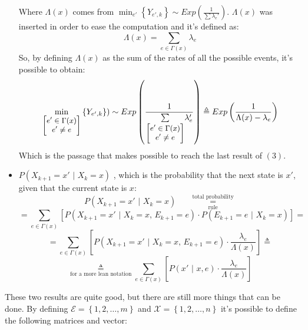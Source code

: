 \documentclass[12pt,a4paper]{article}
\begin{document}
\begin{itemize}
\noindent
Where $\Lambda(x)$ comes from $\min_{e'}{\left\lbrace Y_{e',k}\right\rbrace } \sim Exp\left(\frac{1}
{\sum{\lambda_e'}}\right)$. $\Lambda(x)$ was inserted in order to ease the computation and it's defined as:
$$
\Lambda(x)=\sum_{e \in \Gamma (x)}{\lambda_e}
$$
So, by defining $\Lambda(x)$ as the sum of the rates of all the possible events, it's possible to obtain:
$$
\min_{\small\left[
\begin{matrix}
e'\in \Gamma(x) \cr
e'\neq e
\end{matrix}\right]
}{\left\lbrace Y_{e',k}\right\rbrace }) \sim Exp\left(\frac{1}{\underset{{\small\left[
\begin{matrix}
e'\in \Gamma(x) \cr
e'\neq e
\end{matrix}\right]
}}{\sum
}\lambda_e'}\right)
\triangleq
Exp \left(\frac{1}{\Lambda(x)-\lambda_e}\right)
$$
Which is the passage that makes possible to reach the last result of $(3)$.
\newpage
\item $P(X_{k+1}=x'\hspace{4pt}|\hspace{4pt}X_k=x)$ , which is the probability that the next state is $x'$, given that the current state is $x$:
$$
P(X_{k+1}=x'\hspace{4pt}|\hspace{4pt}X_k=x) \hspace{20pt}\underset{\textrm{rule}}{\overset{\textrm{total probability}}{=}}
$$
$$
=\sum_{e\in \Gamma(x)}{
\left[
P\left(
X_{k+1}=x'\hspace{4pt}|\hspace{4pt}X_k=x\textrm{, }E_{k+1}=e
\right)\cdot
P\left(
E_{k+1}=e\hspace{4pt}|\hspace{4pt}X_k=x
\right)
\right]
}=
$$
$$
=
\sum_{e\in \Gamma(x)}{
\left[
P\left(
X_{k+1}=x'\hspace{4pt}|\hspace{4pt}X_k=x\textrm{, }E_{k+1}=e
\right)\cdot
\frac{\lambda_e}{\Lambda(x)}
\right]}\triangleq
$$
$$
\underset{\textrm{for a more lean notation}}{\triangleq}
\sum_{e\in \Gamma(x)}{
\left[
P\left(x'\hspace{4pt}|\hspace{4pt}x,e
\right)\cdot
\frac{\lambda_e}{\Lambda(x)}
\right]}
$$
\end{itemize}
These two results are quite good, but there are still more things that can be done. By defining 
$\mathcal{E}=\left\lbrace 1,2,\dots,m \right\rbrace$ and 
$\mathcal{X}=\left\lbrace 1,2,\dots,n \right\rbrace$
it's possible to define the following matrices and vector:
\end{document}
